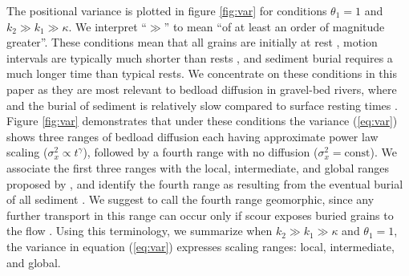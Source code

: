 \documentclass[draft,grl]{agujournal2018}
\begin{document}
The positional variance is plotted in figure \ref{fig:var} for conditions $\theta_1=1$ and $k_2\gg k_1 \gg \kappa$.
We interpret ``$\gg$'' to mean ``of at least an order of magnitude greater''.
These conditions mean that all grains are initially at rest \citep[cf.,][]{Wu2019}, motion intervals are typically much shorter than rests \citep[cf.,][]{Einstein1937}, and sediment burial requires a much longer time than typical rests.
We concentrate on these conditions in this paper as they are most relevant to bedload diffusion in gravel-bed rivers, where  and the burial of sediment is relatively slow compared to surface resting times \citep[e.g.,][]{Ferguson2002,Hassan1994}.
Figure \ref{fig:var} demonstrates that under these conditions the variance (\ref{eq:var}) shows three ranges of bedload diffusion each having approximate power law scaling ($\sigma_x^2 \propto t^\gamma$), followed by a fourth range with no diffusion ($\sigma_x^2 = \text{const}$). We associate the first three ranges with the local, intermediate, and global ranges proposed by \citet{Nikora2001a,Nikora2002}, and identify the fourth range as resulting from the eventual burial of all sediment .
We suggest to call the fourth range geomorphic, since any further transport in this range can occur only if scour exposes buried grains to the flow \citep[cf.,][]{Nakagawa1980,Voepel2013,Martin2014,Wu2019a}.
Using this terminology, we summarize when $k_2\gg k_1 \gg \kappa$ and $\theta_1=1$, the variance in equation (\ref{eq:var}) expresses  scaling ranges: local, intermediate, and global.
\end{document}
